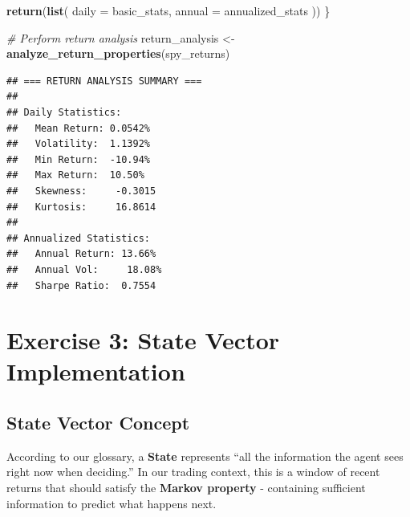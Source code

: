 \documentclass[
]{article}
\newenvironment{Shaded}{\begin{snugshade}}{\end{snugshade}}
\newcommand{\AttributeTok}[1]{\textcolor[rgb]{0.13,0.29,0.53}{#1}}
\newcommand{\CommentTok}[1]{\textcolor[rgb]{0.56,0.35,0.01}{\textit{#1}}}
\newcommand{\FunctionTok}[1]{\textcolor[rgb]{0.13,0.29,0.53}{\textbf{#1}}}
\newcommand{\NormalTok}[1]{#1}
\newcommand{\OtherTok}[1]{\textcolor[rgb]{0.56,0.35,0.01}{#1}}
\begin{document}
\begin{Shaded}
\begin{Highlighting}[]
  \FunctionTok{return}\NormalTok{(}\FunctionTok{list}\NormalTok{(}
    \AttributeTok{daily =}\NormalTok{ basic\_stats,}
    \AttributeTok{annual =}\NormalTok{ annualized\_stats}
\NormalTok{  ))}
\NormalTok{\}}

\CommentTok{\# Perform return analysis}
\NormalTok{return\_analysis }\OtherTok{\textless{}{-}} \FunctionTok{analyze\_return\_properties}\NormalTok{(spy\_returns)}
\end{Highlighting}
\end{Shaded}

\begin{verbatim}
## === RETURN ANALYSIS SUMMARY ===
## 
## Daily Statistics:
##   Mean Return: 0.0542% 
##   Volatility:  1.1392% 
##   Min Return:  -10.94% 
##   Max Return:  10.50% 
##   Skewness:     -0.3015 
##   Kurtosis:     16.8614 
## 
## Annualized Statistics:
##   Annual Return: 13.66% 
##   Annual Vol:     18.08% 
##   Sharpe Ratio:  0.7554
\end{verbatim}

\hypertarget{exercise-3-state-vector-implementation}{%
\section{Exercise 3: State Vector
Implementation}\label{exercise-3-state-vector-implementation}}

\hypertarget{state-vector-concept}{%
\subsection{State Vector Concept}\label{state-vector-concept}}

According to our glossary, a \textbf{State} represents ``all the
information the agent sees right now when deciding.'' In our trading
context, this is a window of recent returns that should satisfy the
\textbf{Markov property} - containing sufficient information to predict
what happens next.
\end{document}

